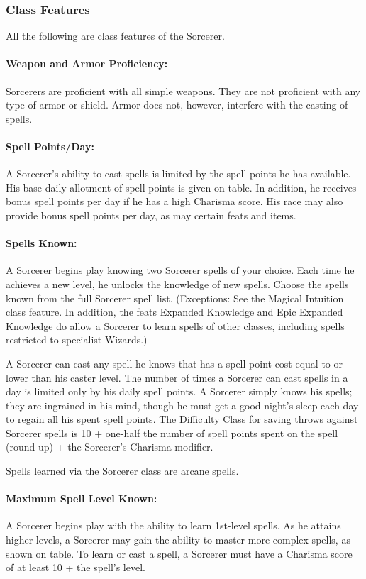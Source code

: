 \subsubsection{Class Features}
All the following are class features of the Sorcerer.

\paragraph{Weapon and Armor Proficiency:} Sorcerers are proficient with all simple weapons. 
They are not proficient with any type of armor or shield. 
Armor does not, however, interfere with the casting of spells.

\paragraph{Spell Points/Day:} 
A Sorcerer's ability to cast spells is limited by the spell points he has available. 
His base daily allotment of spell points is given on  table. 
In addition, he receives bonus spell points per day if he has a high Charisma score.
His race may also provide bonus spell points per day, as may certain feats and items.

\paragraph{Spells Known:} A Sorcerer begins play knowing two Sorcerer spells of your choice. 
Each time he achieves a new level, he unlocks the knowledge of new spells.
Choose the spells known from the full Sorcerer spell list.
(Exceptions: See the Magical Intuition class feature.
In addition, the feats Expanded Knowledge and Epic Expanded Knowledge 
do allow a Sorcerer to learn spells of other classes, 
including spells restricted to specialist Wizards.) 

A Sorcerer can cast any spell he knows that has a spell point cost equal to or lower than his caster level.
The number of times a Sorcerer can cast spells in a day is limited only by his daily spell points. 
A Sorcerer simply knows his spells; they are ingrained in his mind, 
though he must get a good night's sleep each day to regain all his spent spell points.
The Difficulty Class for saving throws against Sorcerer spells is 10 + one-half the number of spell points spent on the spell (round up) + the Sorcerer's Charisma modifier. 

Spells learned via the Sorcerer class are arcane spells.
\paragraph{Maximum Spell Level Known:} A Sorcerer begins play with the ability to learn 1st-level spells. 
As he attains higher levels, 
a Sorcerer may gain the ability to master more complex spells, as shown on  table.
To learn or cast a spell, a Sorcerer must have a Charisma score of at least 10 + the spell's level.

